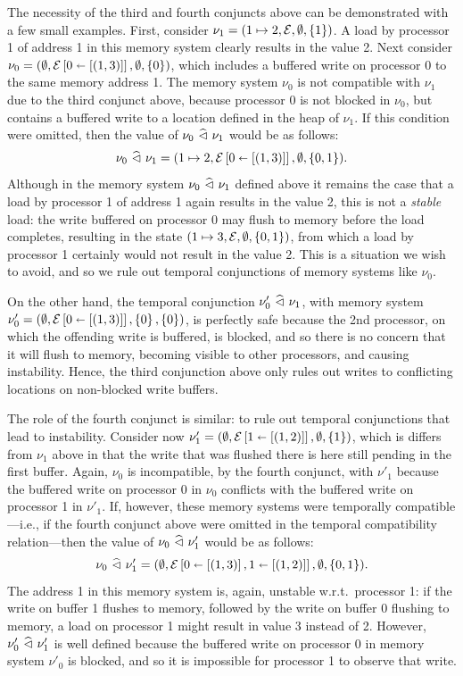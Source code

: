 \documentclass[11pt]{report}
\begin{document}
The necessity of the third and fourth conjuncts above can be demonstrated with a few small examples. First, consider $\nu_1 = (1 \mapsto 2, \mathcal{E}, \operatorname{\emptyset}, \left\lbrace 1 \right\rbrace)$. A load by processor 1 of address 1 in this memory system clearly results in the value 2. Next consider $\nu_0 = (\operatorname{\emptyset},\mathcal{E} \left[ 0 \shortleftarrow \left[(1,3)\right] \right],\operatorname{\emptyset},\left\lbrace 0 \right\rbrace)$, which includes a buffered write on processor 0 to the same memory address 1. The memory system $\nu_0$ is not compatible with $\nu_1$ due to the third conjunct above, because processor 0 is not blocked in $\nu_0$, but contains a buffered write to a location defined in the heap of $\nu_1$. If this condition were omitted, then the value of $\nu_0 \operatorname{\,\widehat{\vartriangleleft}\,} \nu_1$ would be as follows: \[ \nu_0 \operatorname{\,\widehat{\vartriangleleft}\,} \nu_1 = (1 \mapsto 2, \mathcal{E} \left[ 0 \shortleftarrow \left[(1,3)\right] \right], \operatorname{\emptyset}, \left\lbrace 0,1 \right\rbrace).\] Although in the memory system $\nu_0 \operatorname{\,\widehat{\vartriangleleft}\,} \nu_1$ defined above it remains the case that a load by processor 1 of address 1 again results in the value 2, this is not a \emph{stable} load: the write buffered on processor 0 may flush to memory before the load completes, resulting in the state $(1 \mapsto 3, \mathcal{E}, \operatorname{\emptyset}, \left\lbrace 0,1 \right\rbrace)$, from which a load by processor 1 certainly would not result in the value 2. This is a situation we wish to avoid, and so we rule out temporal conjunctions of memory systems like $\nu_0$. 

On the other hand, the temporal conjunction $\nu'_0 \operatorname{\,\widehat{\vartriangleleft}\,} \nu_1$, with memory system $\nu'_0 = (\operatorname{\emptyset},\mathcal{E} \left[ 0 \shortleftarrow \left[(1,3)\right] \right],\left\lbrace 0 \right\rbrace,\left\lbrace 0 \right\rbrace)$, is perfectly safe because the 2nd processor, on which the offending write is buffered, is blocked, and so there is no concern that it will flush to memory, becoming visible to other processors, and causing instability. Hence, the third conjunction above only rules out writes to conflicting locations on non-blocked write buffers. 

The role of the fourth conjunct is similar: to rule out temporal conjunctions that lead to instability. Consider now $\nu'_1 = (\operatorname{\emptyset},\mathcal{E} \left[ 1 \shortleftarrow \left[(1,2)\right] \right], \operatorname{\emptyset}, \left\lbrace 1 \right\rbrace)$, which is differs from $\nu_1$ above in that the write that was flushed there is here still pending in the first buffer. Again, $\nu_0$ is incompatible, by the fourth conjunct, with $\nu'_1$ because the buffered write on processor 0 in $\nu_0$ conflicts with the buffered write on processor 1 in $\nu'_1$. If, however, these memory systems were temporally compatible---i.e., if the fourth conjunct above were omitted in the temporal compatibility relation---then the value of $\nu_0 \operatorname{\,\widehat{\vartriangleleft}\,} \nu'_1$ would be as follows: \[ \nu_0 \operatorname{\,\widehat{\vartriangleleft}\,} \nu'_1 = (\operatorname{\emptyset}, \mathcal{E} \left[ 0 \shortleftarrow \left[(1,3)\right], 1 \shortleftarrow \left[(1,2)\right] \right], \operatorname{\emptyset}, \left\lbrace 0,1 \right\rbrace).\] The address 1 in this memory system is, again, unstable w.r.t.\ processor 1: if the write on buffer 1 flushes to memory, followed by the write on buffer 0 flushing to memory, a load on processor 1 might result in value 3 instead of 2. However, $\nu'_0 \operatorname{\,\widehat{\vartriangleleft}\,} \nu'_1$ is well defined because the buffered write on processor 0 in memory system $\nu'_0$ is blocked, and so it is impossible for processor 1 to observe that write. 
\end{document}
